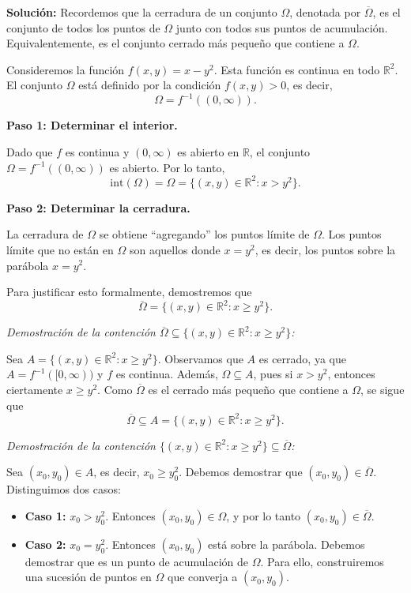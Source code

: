 \documentclass[12pt]{article}
\newcommand{\Int}{\mathrm{int}}
\newcommand{\R}{\mathbb R}
\begin{document}
\begin{enumerate}
\textbf{Solución: } Recordemos que la cerradura de un conjunto $\Omega$, denotada por $\overline{\Omega}$, es el conjunto de todos los puntos de $\Omega$ junto con todos sus puntos de acumulación. Equivalentemente, es el conjunto cerrado más pequeño que contiene a $\Omega$.

Consideremos la función $f(x,y) = x - y^2$. Esta función es continua en todo $\R^2$. El conjunto $\Omega$ está definido por la condición $f(x,y) > 0$, es decir,
\[
\Omega = f^{-1}((0, \infty)).
\]

\textbf{Paso 1: Determinar el interior.}

Dado que $f$ es continua y $(0, \infty)$ es abierto en $\R$, el conjunto $\Omega = f^{-1}((0, \infty))$ es abierto. Por lo tanto,
\[
\Int(\Omega) = \Omega = \{ (x,y)\in \R^2 : x > y^2 \}.
\]

\textbf{Paso 2: Determinar la cerradura.}

La cerradura de $\Omega$ se obtiene ``agregando'' los puntos límite de $\Omega$. Los puntos límite que no están en $\Omega$ son aquellos donde $x = y^2$, es decir, los puntos sobre la parábola $x = y^2$.

Para justificar esto formalmente, demostremos que
\[
\overline{\Omega} = \{ (x,y)\in \R^2 : x \geq y^2 \}.
\]

\textit{Demostración de la contención $\overline{\Omega} \subseteq \{ (x,y)\in \R^2 : x \geq y^2 \}$:}

Sea $A = \{ (x,y)\in \R^2 : x \geq y^2 \}$. Observamos que $A$ es cerrado, ya que $A = f^{-1}([0, \infty))$ y $f$ es continua. Además, $\Omega \subseteq A$, pues si $x > y^2$, entonces ciertamente $x \geq y^2$. Como $\overline{\Omega}$ es el cerrado más pequeño que contiene a $\Omega$, se sigue que
\[
\overline{\Omega} \subseteq A = \{ (x,y)\in \R^2 : x \geq y^2 \}.
\]

\textit{Demostración de la contención $\{ (x,y)\in \R^2 : x \geq y^2 \} \subseteq \overline{\Omega}$:}

Sea $(x_0, y_0) \in A$, es decir, $x_0 \geq y_0^2$. Debemos demostrar que $(x_0, y_0) \in \overline{\Omega}$. Distinguimos dos casos:

\begin{itemize}
    \item \textbf{Caso 1:} $x_0 > y_0^2$. Entonces $(x_0, y_0) \in \Omega$, y por lo tanto $(x_0, y_0) \in \overline{\Omega}$.
    
    \item \textbf{Caso 2:} $x_0 = y_0^2$. Entonces $(x_0, y_0)$ está sobre la parábola. Debemos demostrar que es un punto de acumulación de $\Omega$. Para ello, construiremos una sucesión de puntos en $\Omega$ que converja a $(x_0, y_0)$.
    

\end{itemize}
\end{enumerate}
\end{document}
